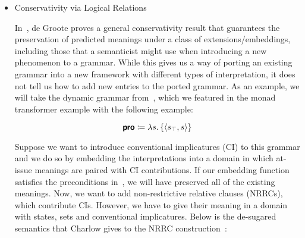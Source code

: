 \begin{itemize}
  In our thesis, instead of going this road, we build a composite (free)
  monad. We do so because of two reasons. First, our investigations are
  motivated by the search for a wide-coverage abstract categorial grammar
  (ACG) with formal semantics. In ACGs, derivations are expressed in an
  abstract grammar, which intuitively corresponds to a level of deep
  syntax. Using a similar approach would force us to introduce semantic
  types into the level of abstract syntax. Furthermore, the logic which
  licences derivations would need to be extended to include monadic types
  (i.e.\ we would need to add modalities to the implicative fragment of
  linear logic used in ACGs), which means we would risk losing the existing
  ACG meta-theory, such as parsing results. Second, the point of using
  $\calc$ is to deal with ``non-compositional'' phenomena in a
  compositional setting. If we rearrange the deep syntax so as to
  facilitate composition, then we could be considered
  cheating.\footnote{Though when it comes to ``non-compositional''
    phenomena, cheating compositionality might actually be the
    methodologically sound approach.}

\item Conservativity via Logical
  Relations~\cite{degroote2015conservativity}

  In~\cite{degroote2015conservativity}, de Groote proves a general
  conservativity result that guarantees the preservation of predicted
  meanings under a class of extensions/embeddings, including those that a
  semanticist might use when introducing a new phenomenon to a
  grammar. While this gives us a way of porting an existing grammar into a
  new framework with different types of interpretation, it does not tell us
  how to add new entries to the ported grammar. As an example, we will take
  the dynamic grammar from~\cite{charlow2014semantics}, which we featured
  in the monad transformer example with the following example:

  $$
  \textsf{\textbf{pro}} \coloneqq \lambda s.\, \{ \left< s_\top, s \right> \}
  $$

  Suppose we want to introduce conventional implicatures (CI) to this
  grammar and we do so by embedding the interpretations into a domain in
  which at-issue meanings are paired with CI contributions. If our
  embedding function satisfies the preconditions
  in~\cite{degroote2015conservativity}, we will have preserved all of the
  existing meanings. Now, we want to add non-restrictive relative clauses
  (NRRCs), which contribute CIs. However, we have to give their meaning in
  a domain with states, sets and conventional implicatures. Below is the
  de-sugared semantics that Charlow gives to the NRRC
  construction~\cite{charlow2015conventional}:


\end{itemize}
